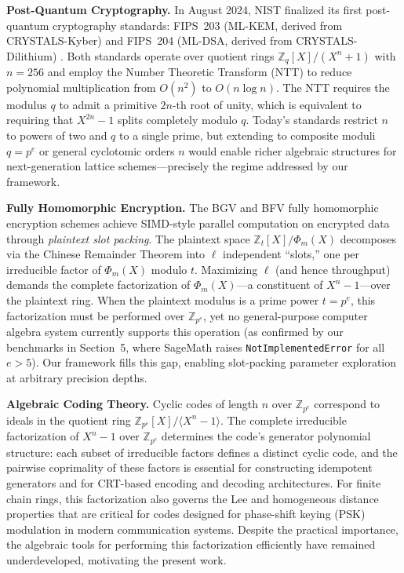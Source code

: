 \documentclass[12pt]{article}
\theoremstyle{plain}
\begin{document}
\textbf{Post-Quantum Cryptography.}
In August 2024, NIST finalized its first post-quantum cryptography standards: FIPS~203 (ML-KEM, derived from CRYSTALS-Kyber) and FIPS~204 (ML-DSA, derived from CRYSTALS-Dilithium) \cite{kyber_paper, dilithium_paper}. Both standards operate over quotient rings $\mathbb{Z}_q[X]/(X^n+1)$ with $n=256$ and employ the Number Theoretic Transform (NTT) to reduce polynomial multiplication from $O(n^2)$ to $O(n \log n)$. The NTT requires the modulus $q$ to admit a primitive $2n$-th root of unity, which is equivalent to requiring that $X^{2n}-1$ splits completely modulo $q$. Today's standards restrict $n$ to powers of two and $q$ to a single prime, but extending to composite moduli $q = p^e$ or general cyclotomic orders $n$ would enable richer algebraic structures for next-generation lattice schemes---precisely the regime addressed by our framework.

\textbf{Fully Homomorphic Encryption.}
The BGV and BFV fully homomorphic encryption schemes \cite{brakerski2014leveled, Smart2014Fully} achieve SIMD-style parallel computation on encrypted data through \emph{plaintext slot packing}. The plaintext space $\mathbb{Z}_t[X]/\Phi_m(X)$ decomposes via the Chinese Remainder Theorem into $\ell$ independent ``slots,'' one per irreducible factor of $\Phi_m(X)$ modulo $t$. Maximizing $\ell$ (and hence throughput) demands the complete factorization of $\Phi_m(X)$---a constituent of $X^n-1$---over the plaintext ring. When the plaintext modulus is a prime power $t = p^e$, this factorization must be performed over $\mathbb{Z}_{p^e}$, yet no general-purpose computer algebra system currently supports this operation (as confirmed by our benchmarks in Section~5, where SageMath raises \texttt{NotImplementedError} for all $e > 5$). Our framework fills this gap, enabling slot-packing parameter exploration at arbitrary precision depths.

\textbf{Algebraic Coding Theory.}
Cyclic codes of length $n$ over $\mathbb{Z}_{p^e}$ correspond to ideals in the quotient ring $\mathbb{Z}_{p^e}[X]/\langle X^n-1 \rangle$. The complete irreducible factorization of $X^n-1$ over $\mathbb{Z}_{p^e}$ determines the code's generator polynomial structure: each subset of irreducible factors defines a distinct cyclic code, and the pairwise coprimality of these factors is essential for constructing idempotent generators and for CRT-based encoding and decoding architectures. For finite chain rings, this factorization also governs the Lee and homogeneous distance properties that are critical for codes designed for phase-shift keying (PSK) modulation in modern communication systems. Despite the practical importance, the algebraic tools for performing this factorization efficiently have remained underdeveloped, motivating the present work.
\end{document}
